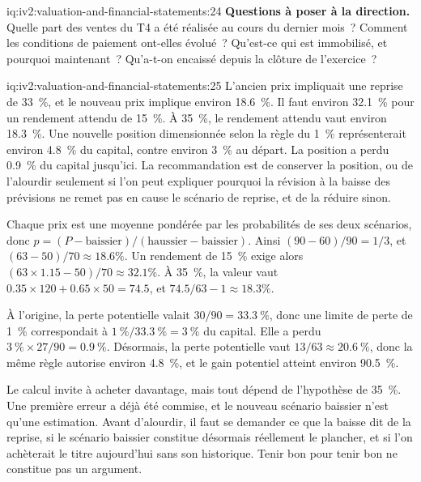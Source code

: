 \begin{solution}{iq:iv2:valuation-and-financial-statements:24}
\textbf{Questions à poser à la direction.} Quelle part des ventes du T4 a été réalisée au cours du dernier mois~? Comment les conditions de paiement ont-elles évolué~? Qu'est-ce qui est immobilisé, et pourquoi maintenant~? Qu'a-t-on encaissé depuis la clôture de l'exercice~?

\end{solution}

\begin{solution}{iq:iv2:valuation-and-financial-statements:25}
L'ancien prix impliquait une reprise de 33~\%, et le nouveau prix implique environ 18.6~\%. Il faut environ 32.1~\% pour un rendement attendu de 15~\%. À 35~\%, le rendement attendu vaut environ 18.3~\%. Une nouvelle position dimensionnée selon la règle du 1~\% représenterait environ 4.8~\% du capital, contre environ 3~\% au départ. La position a perdu 0.9~\% du capital jusqu'ici. La recommandation est de conserver la position, ou de l'alourdir seulement si l'on peut expliquer pourquoi la révision à la baisse des prévisions ne remet pas en cause le scénario de reprise, et de la réduire sinon.

Chaque prix est une moyenne pondérée par les probabilités de ses deux scénarios, donc $p = (P - \text{baissier})/(\text{haussier} - \text{baissier})$. Ainsi $(90 - 60)/90 = 1/3$, et $(63 - 50)/70 \approx 18.6\%$. Un rendement de 15~\% exige alors $(63 \times 1.15 - 50)/70 \approx 32.1\%$. À 35~\%, la valeur vaut $0.35 \times 120 + 0.65 \times 50 = 74.5$, et $74.5/63 - 1 \approx 18.3\%$.

À l'origine, la perte potentielle valait $30/90 = 33.3~\%$, donc une limite de perte de 1~\% correspondait à $1~\%/33.3~\% = 3~\%$ du capital. Elle a perdu $3~\% \times 27/90 = 0.9~\%$. Désormais, la perte potentielle vaut $13/63 \approx 20.6~\%$, donc la même règle autorise environ 4.8~\%, et le gain potentiel atteint environ 90.5~\%.

Le calcul invite à acheter davantage, mais tout dépend de l'hypothèse de 35~\%. Une première erreur a déjà été commise, et le nouveau scénario baissier n'est qu'une estimation. Avant d'alourdir, il faut se demander ce que la baisse dit de la reprise, si le scénario baissier constitue désormais réellement le plancher, et si l'on achèterait le titre aujourd'hui sans son historique. Tenir bon pour tenir bon ne constitue pas un argument.


\end{solution}
